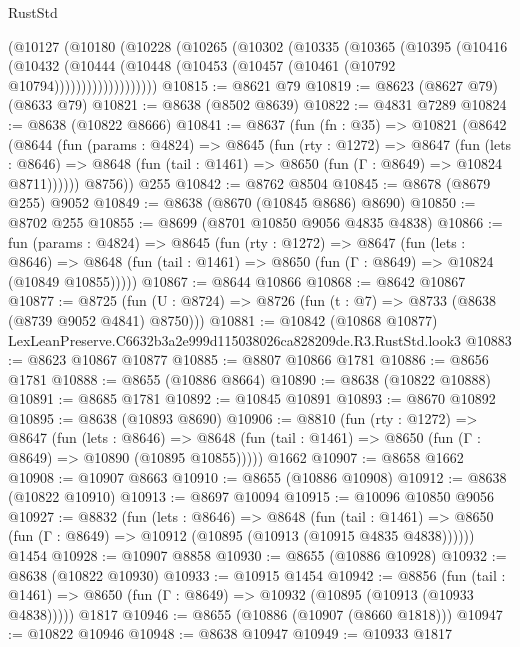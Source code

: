 \begin{lexlean}{RustStd}
\begin{coremodule}
          (@10127
            (@10180
              (@10228
                (@10265
                  (@10302
                    (@10335
                      (@10365
                        (@10395
                          (@10416
                            (@10432
                              (@10444
                                (@10448 (@10453 (@10457 (@10461 (@10792 @10794)))))))))))))))))))
@10815 := @8621 @79
@10819 := @8623 (@8627 @79) (@8633 @79)
@10821 := @8638 (@8502 @8639)
@10822 := @4831 @7289
@10824 := @8638 (@10822 @8666)
@10841 := @8637
    (fun (fn : @35) =>
    @10821
      (@8642
        (@8644
          (fun (params : @4824) =>
          @8645
            (fun (rty : @1272) =>
            @8647
              (fun (lets : @8646) =>
              @8648 (fun (tail : @1461) => @8650 (fun (Γ : @8649) => @10824 @8711))))))
        @8756))
    @255
@10842 := @8762 @8504
@10845 := @8678 (@8679 @255) @9052
@10849 := @8638 (@8670 (@10845 @8686) @8690)
@10850 := @8702 @255
@10855 := @8699 (@8701 @10850 @9056 @4835 @4838)
@10866 := fun (params : @4824) =>
  @8645
    (fun (rty : @1272) =>
    @8647
      (fun (lets : @8646) =>
      @8648 (fun (tail : @1461) => @8650 (fun (Γ : @8649) => @10824 (@10849 @10855)))))
@10867 := @8644 @10866
@10868 := @8642 @10867
@10877 := @8725 (fun (U : @8724) => @8726 (fun (t : @7) => @8733 (@8638 (@8739 @9052 @4841) @8750)))
@10881 := @10842 (@10868 @10877) LexLeanPreserve.C6632b3a2e999d115038026ca828209de.R3.RustStd.look3
@10883 := @8623 @10867 @10877
@10885 := @8807 @10866 @1781
@10886 := @8656 @1781
@10888 := @8655 (@10886 @8664)
@10890 := @8638 (@10822 @10888)
@10891 := @8685 @1781
@10892 := @10845 @10891
@10893 := @8670 @10892
@10895 := @8638 (@10893 @8690)
@10906 := @8810
    (fun (rty : @1272) =>
    @8647
      (fun (lets : @8646) =>
      @8648 (fun (tail : @1461) => @8650 (fun (Γ : @8649) => @10890 (@10895 @10855)))))
    @1662
@10907 := @8658 @1662
@10908 := @10907 @8663
@10910 := @8655 (@10886 @10908)
@10912 := @8638 (@10822 @10910)
@10913 := @8697 @10094
@10915 := @10096 @10850 @9056
@10927 := @8832
    (fun (lets : @8646) =>
    @8648
      (fun (tail : @1461) =>
      @8650 (fun (Γ : @8649) => @10912 (@10895 (@10913 (@10915 @4835 @4838))))))
    @1454
@10928 := @10907 @8858
@10930 := @8655 (@10886 @10928)
@10932 := @8638 (@10822 @10930)
@10933 := @10915 @1454
@10942 := @8856
    (fun (tail : @1461) => @8650 (fun (Γ : @8649) => @10932 (@10895 (@10913 (@10933 @4838)))))
    @1817
@10946 := @8655 (@10886 (@10907 (@8660 @1818)))
@10947 := @10822 @10946
@10948 := @8638 @10947
@10949 := @10933 @1817

\end{coremodule}
\end{lexlean}
